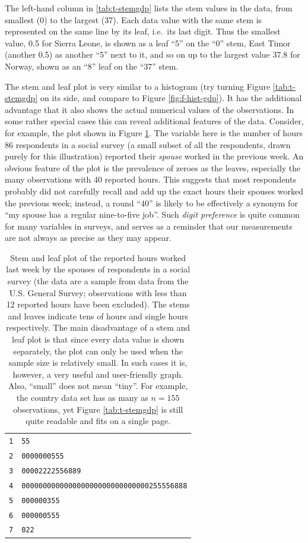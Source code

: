 \documentclass[11pt,a4paper,openany]{book}
\begin{document}
The left-hand column in \ref{tab:t-stemgdp} lists the stem values in the
data, from smallest (0) to the largest (37). Each data value with the
same stem is represented on the same line by its leaf, i.e.~its last
digit. Thus the smallest value, 0.5 for Sierra Leone, is shown as a leaf
``5'' on the ``0'' stem, East Timor (another 0.5) as another ``5'' next
to it, and so on up to the largest value 37.8 for Norway, shown as an
``8'' leaf on the ``37'' stem.

The stem and leaf plot is very similar to a histogram (try turning
Figure \ref{tab:t-stemgdp} on its side, and compare to Figure
\ref{fig:f-hist-gdp}). It has the additional advantage that it also
shows the actual numerical values of the observations. In some rather
special cases this can reveal additional features of the data. Consider,
for example, the plot shown in Figure \ref{tab:t-stemhours}. The
variable here is the number of hours 86 respondents in a social survey
(a small subset of all the respondents, drawn purely for this
illustration) reported their \emph{spouse} worked in the previous week.
An obvious feature of the plot is the prevalence of zeroes as the
leaves, especially the many observations with 40 reported hours. This
suggests that most respondents probably did not carefully recall and add
up the exact hours their spouses worked the previous week; instead, a
round ``40'' is likely to be effectively a synonym for ``my spouse has a
regular nine-to-five job''. Such \emph{digit preference} is quite common
for many variables in surveys, and serves as a reminder that our
measurements are not always as precise as they may appear.

\begin{longtable}[]{@{}ll@{}}
\caption{\label{tab:t-stemhours} Stem and leaf plot of the reported hours
worked last week by the spouses of respondents in a social survey (the
data are a sample from data from the U.S. General Survey; observations
with less than 12 reported hours have been excluded). The stems and
leaves indicate tens of hours and single hours respectively. The main
disadvantage of a stem and leaf plot is that since every data value is
shown separately, the plot can only be used when the sample size is
relatively small. In such cases it is, however, a very useful and
user-friendly graph. Also, ``small'' does not mean ``tiny''. For
example, the country data set has as many as \(n=155\) observations, yet
Figure \ref{tab:t-stemgdp} is still quite readable and fits on a single
page.}\tabularnewline
\toprule
\texttt{1} & \texttt{55}\tabularnewline
\texttt{2} & \texttt{0000000555}\tabularnewline
\texttt{3} & \texttt{00002222556889}\tabularnewline
\texttt{4} &
\texttt{000000000000000000000000000000255556888}\tabularnewline
\texttt{5} & \texttt{000000355}\tabularnewline
\texttt{6} & \texttt{000000555}\tabularnewline
\texttt{7} & \texttt{022}\tabularnewline
\bottomrule
\end{longtable}
\end{document}
